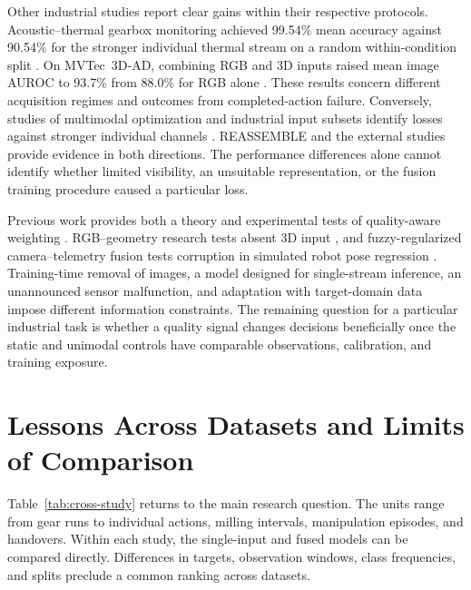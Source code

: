 Other industrial studies report clear gains within their respective protocols. Acoustic--thermal gearbox monitoring achieved 99.54\% mean accuracy against 90.54\% for the stronger individual thermal stream on a random within-condition split \citep[Table~2]{Ying2025Trustworthy}. On MVTec~3D-AD, combining RGB and 3D inputs raised mean image AUROC to 93.7\% from 88.0\% for RGB alone \citep[Table~3]{Rudolph2023Asymmetric}. These results concern different acquisition regimes and outcomes from completed-action failure. Conversely, studies of multimodal optimization and industrial input subsets identify losses against stronger individual channels \citep{Wang2020What,Horwitz2023Back,Goodarzi2023Deep}. REASSEMBLE and the external studies provide evidence in both directions. The performance differences alone cannot identify whether limited visibility, an unsuitable representation, or the fusion training procedure caused a particular loss.

Previous work provides both a theory and experimental tests of quality-aware weighting \citep{Zhang2023QMF}. RGB--geometry research tests absent 3D input \citep[Table~3]{P026}, and fuzzy-regularized camera--telemetry fusion tests corruption in simulated robot pose regression \citep{Altinses2023Fuzzy}. Training-time removal of images, a model designed for single-stream inference, an unannounced sensor malfunction, and adaptation with target-domain data impose different information constraints. The remaining question for a particular industrial task is whether a quality signal changes decisions beneficially once the static and unimodal controls have comparable observations, calibration, and training exposure.

\section{Lessons Across Datasets and Limits of Comparison}
Table~\ref{tab:cross-study} returns to the main research question. The units range from gear runs to individual actions, milling intervals, manipulation episodes, and handovers. Within each study, the single-input and fused models can be compared directly. Differences in targets, observation windows, class frequencies, and splits preclude a common ranking across datasets.

